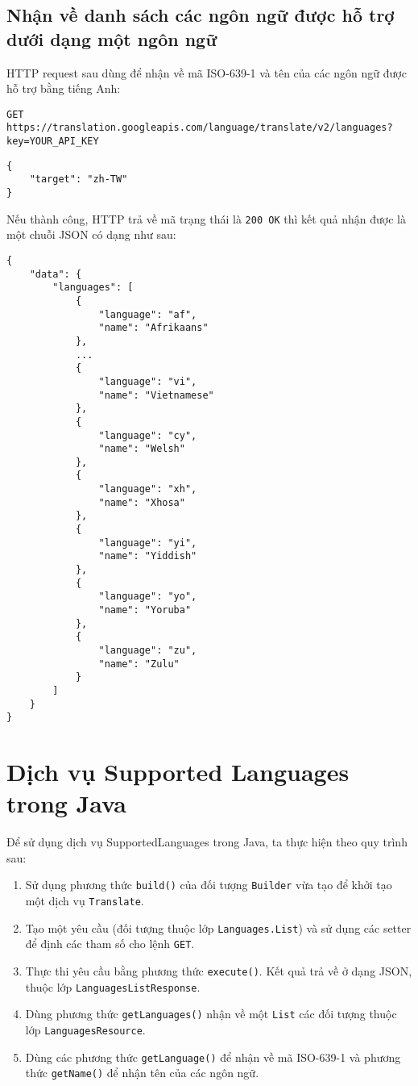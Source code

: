 \documentclass[../thesis.tex]{subfiles}
\begin{document}
\subsection{Nhận về danh sách các ngôn ngữ được hỗ trợ dưới dạng một ngôn ngữ}
HTTP request sau dùng để nhận về mã ISO-639-1 và tên của các ngôn ngữ được hỗ trợ bằng tiếng Anh:
\begin{lstlisting}[style=link]
GET https://translation.googleapis.com/language/translate/v2/languages?key=YOUR_API_KEY
\end{lstlisting}
\begin{lstlisting}[style=link]
{
	"target": "zh-TW"
}
\end{lstlisting}

Nếu thành công, HTTP trả về mã trạng thái là \lstinline{200 OK} thì kết quả nhận được là một chuỗi JSON có dạng như sau:

\begin{lstlisting}[style=link]
{
	"data": {
		"languages": [
			{
				"language": "af",
				"name": "Afrikaans"
			},
			...
			{
				"language": "vi",
				"name": "Vietnamese"
			},
			{
				"language": "cy",
				"name": "Welsh"
			},
			{
				"language": "xh",
				"name": "Xhosa"
			},
			{
				"language": "yi",
				"name": "Yiddish"
			},
			{
				"language": "yo",
				"name": "Yoruba"
			},
			{
				"language": "zu",
				"name": "Zulu"
			}
		]
	}
}
\end{lstlisting}

\section{Dịch vụ Supported Languages trong Java}
Để sử dụng dịch vụ SupportedLanguages trong Java, ta thực hiện theo quy trình sau:
\begin{enumerate}
  \item Sử dụng phương thức \lstinline{build()} của đối tượng \lstinline{Builder} vừa tạo để khởi tạo một dịch vụ \lstinline{Translate}.
  \item Tạo một yêu cầu (đối tượng thuộc lớp \lstinline{Languages.List}) và sử dụng các setter để định các tham số cho lệnh \lstinline{GET}.
  \item Thực thi yêu cầu bằng phương thức \lstinline{execute()}. Kết quả trả về ở dạng JSON, thuộc lớp \lstinline{LanguagesListResponse}.
  \item Dùng phương thức \lstinline{getLanguages()} nhận về một \lstinline{List} các đối tượng thuộc lớp \lstinline{LanguagesResource}.
  \item Dùng các phương thức \lstinline{getLanguage()} để nhận về mã ISO-639-1 và phương thức \lstinline{getName()} để nhận tên của các ngôn ngữ.
\end{enumerate}


\end{document}

